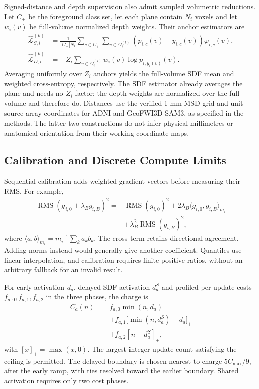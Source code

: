 \documentclass[12pt,a4paper]{article}
\begin{document}
Signed-distance and depth supervision also admit sampled volumetric
reductions. Let $C_+$ be the foreground class set, let each plane
contain $N_i$ voxels and let $w_i(v)$ be full-volume normalized depth
weights. Their anchor estimators are
\begin{align}
\widehat{\mathcal L}_{S,i}^{(k)}
 &=\frac{1}{|C_+|N_i}\sum_{c\in C_+}
   \sum_{v\in\Omega_i^{(k)}}(p_{i,c}(v)-y_{i,c}(v))\varphi_{i,c}(v),
   \label{eq:medsam-sampled-sdf}\\
\widehat{\mathcal L}_{D,i}^{(k)}
 &=-Z_i\sum_{v\in\Omega_i^{(k)}}w_i(v)\log p_{i,y_i(v)}(v).
   \label{eq:medsam-sampled-depth}
\end{align}
Averaging uniformly over $Z_i$ anchors yields the full-volume SDF mean
and weighted cross-entropy, respectively. The SDF estimator already
averages the plane and needs no $Z_i$ factor; the depth weights are
normalized over the full volume and therefore do. Distances use the
verified 1 mm MSD grid and unit source-array coordinates for ADNI and
GeoFWI3D SAM3, as specified in the methods. The latter two constructions
do not infer physical millimetres or anatomical orientation from their
working coordinate maps.

\subsection{Calibration and Discrete Compute Limits}

Sequential calibration adds weighted gradient vectors before measuring
their RMS. For example,
\begin{equation}
\begin{aligned}
\operatorname{RMS}(g_{i,0}+\lambda_B g_{i,B})^2
={}&\operatorname{RMS}(g_{i,0})^2
 +2\lambda_B\langle g_{i,0},g_{i,B}\rangle_{m_i}\\
 &+\lambda_B^2\operatorname{RMS}(g_{i,B})^2,
\end{aligned}
\label{eq:calibration-cross-term}
\end{equation}
where $\langle a,b\rangle_{m_i}=m_i^{-1}\sum_k a_kb_k$.
The cross term retains directional agreement. Adding norms instead
would generally give another coefficient. Quantiles use linear
interpolation, and calibration requires finite positive ratios,
without an arbitrary fallback for an invalid result.

For early activation $d_a$, delayed SDF activation $d_a^S$ and
profiled per-update costs $f_{a,0},f_{a,1},f_{a,2}$ in the three
phases, the charge is
\begin{equation}
\begin{aligned}
C_a(n)={}&f_{a,0}\min(n,d_a)\\
 &+f_{a,1}\bigl[\min(n,d_a^S)-d_a\bigr]_+\\
 &+f_{a,2}[n-d_a^S]_+,
\end{aligned}
\label{eq:piecewise-optimization-cost}
\end{equation}
with $[x]_+=\max(x,0)$. The largest integer update count satisfying
the ceiling is permitted. The delayed boundary is chosen nearest
to charge $5C_{\max}/9$, after the early ramp, with ties resolved
toward the earlier boundary. Shared activation requires only two
cost phases.
\end{document}

